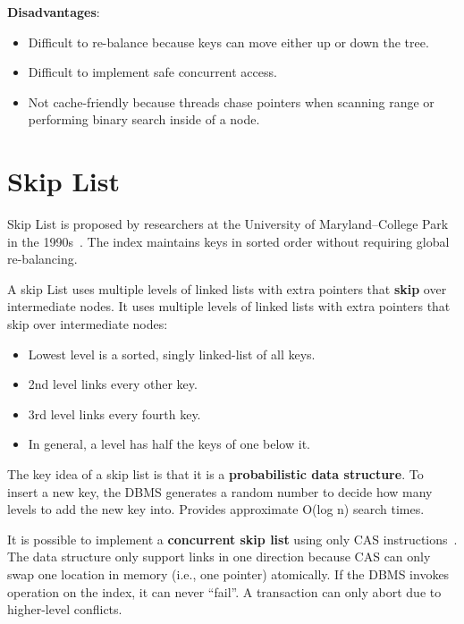 \documentclass[11pt]{article}
\begin{document}
\textbf{Disadvantages}:
\begin{itemize}
    \item
    Difficult to re-balance because keys can move either up or down the tree.
    
    \item
    Difficult to implement safe concurrent access.
    
    \item
    Not cache-friendly because threads chase pointers when scanning range or performing binary search inside of a node.
\end{itemize}

\section{Skip List}
Skip List is proposed by researchers at the University of Maryland--College Park in the 1990s~\cite{p668-pugh}.
The index maintains keys in sorted order without requiring global re-balancing.

A skip List uses multiple levels of linked lists with extra pointers that \textbf{skip} over intermediate nodes. It uses multiple levels of linked lists with extra pointers that skip over intermediate nodes:
\begin{itemize}
    \item
    Lowest level is a sorted, singly linked-list of all keys.
    
    \item
    2nd level links every other key.
    
    \item
    3rd level links every fourth key.
    
    \item
    In general, a level has half the keys of one below it.
\end{itemize}
    
The key idea of a skip list is that it is a \textbf{probabilistic data structure}. To insert a new 
key, the DBMS generates a random number to decide how many levels to add the new key into. 
Provides approximate O(log n) search times.

It is possible to implement a \textbf{concurrent skip list} using only CAS 
instructions~\cite{hpugh-concurrent-tr1990}. The data structure only support links in one direction 
because CAS can only swap one location in memory (i.e., one pointer) atomically.
If the DBMS invokes operation on the index, it can never ``fail''. A transaction can only abort due 
to higher-level conflicts.
\end{document}
